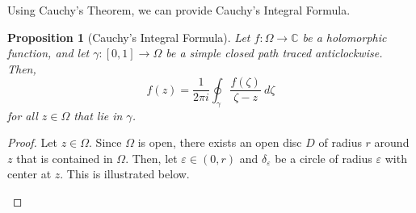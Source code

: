 \documentclass[a4paper, openany]{memoir}
\theoremstyle{definition}
\theoremstyle{plain}
\newtheorem{proposition}[definition]{Proposition}
\begin{document}
Using Cauchy's Theorem, we can provide Cauchy's Integral Formula.
\begin{proposition}[Cauchy's Integral Formula]
Let $f: \Omega \to \mathbb{C}$ be a holomorphic function, and let $\gamma: [0, 1] \to \Omega$ be a simple closed path traced anticlockwise. Then,
\[f(z) = \frac{1}{2\pi i} \oint_\gamma \frac{f(\zeta)}{\zeta - z} \ d\zeta\]
for all $z \in \Omega$ that lie in $\gamma$.
\end{proposition}
\begin{proof}
Let $z \in \Omega$. Since $\Omega$ is open, there exists an open disc $D$ of radius $r$ around $z$ that is contained in $\Omega$. Then, let $\varepsilon \in (0, r)$ and $\delta_\varepsilon$ be a circle of radius $\varepsilon$ with center at $z$. This is illustrated below.
\begin{figure}[H]
    \centering
\end{figure}
\end{proof}
\end{document}
